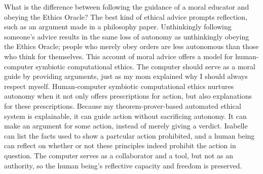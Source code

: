 \begin{isabellebody}
\begin{isamarkuptext}
What is the difference between following the guidance of a moral educator and
obeying the Ethics Oracle? The best kind of ethical advice prompts reflection, such as an argument 
made in a philosophy paper. Unthinkingly following someone’s advice results in the same loss of 
autonomy as unthinkingly obeying the Ethics Oracle; people who merely obey orders are less autonomous 
than those who think for themselves. This account of moral advice offers a model for human-computer 
symbiotic computational ethics. The computer should serve as a moral guide by providing arguments, just as my mom 
explained why I should always respect myself. Human-computer symbiotic computational
ethics nurtures autonomy when it not only offers prescriptions for action, but also explanations for 
these prescriptions. Because my theorem-prover-based automated ethical system is explainable, it can 
guide action without sacrificing autonomy. It can make an argument for some action, instead of 
merely giving a verdict. Isabelle can list the facts used to show
a partcular action prohibited, and a human being can reflect on whether or not these principles
indeed prohibit the action in question. The computer serves as a collaborator and a tool, but not as an authority, 
so the human being’s reflective capacity and freedom is preserved. 


\end{isamarkuptext}
\end{isabellebody}
